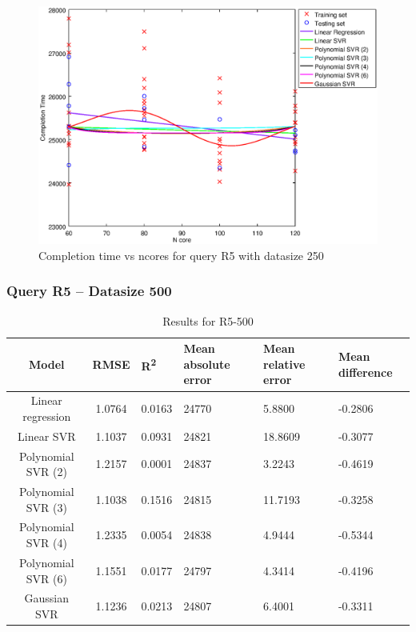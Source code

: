 \documentclass[a4paper,11pt]{article}
\begin{document}
\begin {figure}[hbtp]
\centering
\includegraphics[width=\textwidth]{output/R5_250_ONLY_1_LINEAR_NCORE/plot_R5_250.eps}
\caption{Completion time vs ncores for query R5 with datasize 250}
\label{fig:coreonly_linear_R5_250}
\end {figure}

\newpage
\subsubsection{Query R5 -- Datasize 500}
\begin{table}[H]
	\centering
	\begin{adjustbox}{center}
		\begin{tabular}{c | c M{1.2cm} M{2.5cm} M{2.5cm} M{1.8cm}}
			Model & RMSE & R\textsuperscript{2} & Mean absolute error & Mean relative error & Mean difference \tabularnewline
			\hline
			Linear regression & 1.0764 & 0.0163 &  24770 & 5.8800 & -0.2806 \\
			Linear SVR & 1.1037 & 0.0931 &  24821 & 18.8609 & -0.3077 \\
			Polynomial SVR (2) & 1.2157 & 0.0001 &  24837 & 3.2243 & -0.4619 \\
			Polynomial SVR (3) & 1.1038 & 0.1516 &  24815 & 11.7193 & -0.3258 \\
			Polynomial SVR (4) & 1.2335 & 0.0054 &  24838 & 4.9444 & -0.5344 \\
			Polynomial SVR (6) & 1.1551 & 0.0177 &  24797 & 4.3414 & -0.4196 \\
			Gaussian SVR & 1.1236 & 0.0213 &  24807 & 6.4001 & -0.3311 \\
		\end{tabular}
	\end{adjustbox}
	\\
	\caption{Results for R5-500}
	\label{fig:coreonly_linear_R5_500}
\end{table}
\end{document}
